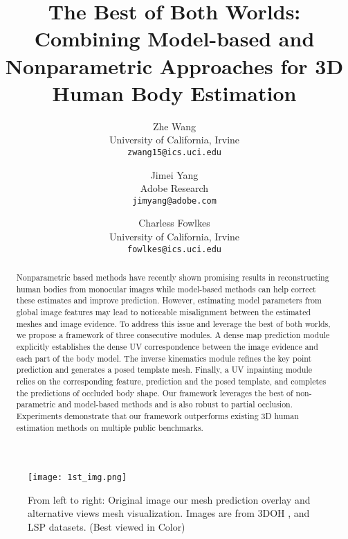 \documentclass[10pt,twocolumn,letterpaper]{article}
\begin{document}
\title{The Best of Both Worlds: Combining Model-based and Nonparametric Approaches for 3D Human Body Estimation}

\author{Zhe Wang\\
University of California, Irvine\\
{\tt\small zwang15@ics.uci.edu}
\and
Jimei Yang\\
Adobe Research\\
{\tt\small jimyang@adobe.com}
\and
Charless Fowlkes\\
University of California, Irvine\\
{\tt\small fowlkes@ics.uci.edu}
}
\maketitle

\begin{abstract}
Nonparametric based methods have recently shown promising results in reconstructing human bodies from monocular images while model-based methods can  help correct these estimates and improve prediction. However, estimating model parameters from global image features may lead to noticeable misalignment between the estimated meshes and image evidence. To address this issue and leverage the best of both worlds, we propose a framework of three consecutive modules. A dense map prediction module explicitly establishes the dense UV correspondence between the image evidence and each part of the body model. The inverse kinematics module refines the key point prediction and generates a posed template mesh. Finally, a UV inpainting module relies on the corresponding feature, prediction and the posed template, and completes the predictions of occluded body shape. Our framework leverages the best of non-parametric and model-based methods and is also robust to partial occlusion. Experiments demonstrate that our framework outperforms existing 3D human estimation methods on multiple public benchmarks. 
  
\end{abstract}




\begin{figure}
\centering
\texttt{[image: 1st\_img.png]}
\caption{{From left to right: Original image our mesh prediction overlay and alternative views mesh visualization. Images are from 3DOH \cite{3DOH},  and LSP \cite{lsp}  datasets. (Best viewed in Color)}}
\label{fig:firstimage}
\end{figure}
\end{document}

